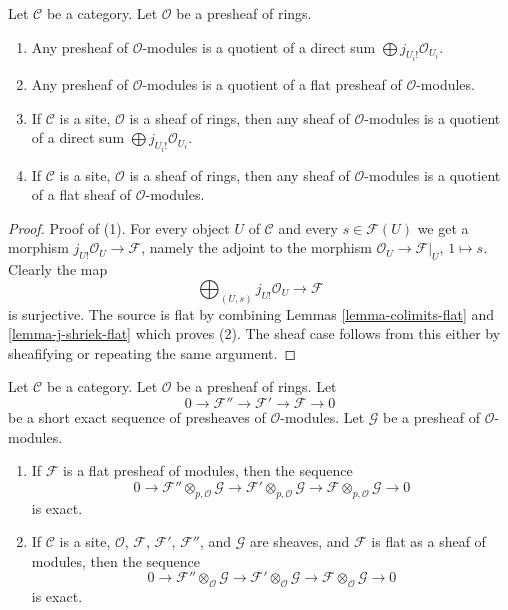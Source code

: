 \begin{lemma}
\label{lemma-module-quotient-flat}
Let $\mathcal{C}$ be a category.
Let $\mathcal{O}$ be a presheaf of rings.
\begin{enumerate}
\item Any presheaf of $\mathcal{O}$-modules is a quotient of
a direct sum $\bigoplus j_{U_i!}\mathcal{O}_{U_i}$.
\item Any presheaf of $\mathcal{O}$-modules is a quotient of
a flat presheaf of $\mathcal{O}$-modules.
\item If $\mathcal{C}$ is a site, $\mathcal{O}$ is a sheaf of rings,
then any sheaf of $\mathcal{O}$-modules is a quotient of
a direct sum $\bigoplus j_{U_i!}\mathcal{O}_{U_i}$.
\item If $\mathcal{C}$ is a site, $\mathcal{O}$ is a sheaf of rings,
then any sheaf of $\mathcal{O}$-modules is a quotient of
a flat sheaf of $\mathcal{O}$-modules.
\end{enumerate}
\end{lemma}

\begin{proof}
Proof of (1). For every object $U$ of $\mathcal{C}$ and every
$s \in \mathcal{F}(U)$ we get a morphism
$j_{U!}\mathcal{O}_U \to \mathcal{F}$, namely the adjoint to
the morphism $\mathcal{O}_U \to \mathcal{F}|_U$, $1 \mapsto s$.
Clearly the map
$$
\bigoplus\nolimits_{(U, s)} j_{U!}\mathcal{O}_U
\longrightarrow
\mathcal{F}
$$
is surjective. The source is flat by combining Lemmas
\ref{lemma-colimits-flat} and \ref{lemma-j-shriek-flat}
which proves (2). The sheaf case follows from this either by
sheafifying or repeating the same argument.
\end{proof}

\begin{lemma}
\label{lemma-flat-tor-zero}
Let $\mathcal{C}$ be a category.
Let $\mathcal{O}$ be a presheaf of rings.
Let
$$
0 \to \mathcal{F}'' \to \mathcal{F}' \to \mathcal{F} \to 0
$$
be a short exact sequence of presheaves of $\mathcal{O}$-modules.
Let $\mathcal{G}$ be a presheaf of $\mathcal{O}$-modules.
\begin{enumerate}
\item If $\mathcal{F}$ is a flat presheaf of modules, then
the sequence
$$
0 \to
\mathcal{F}'' \otimes_{p, \mathcal{O}} \mathcal{G} \to
\mathcal{F}' \otimes_{p, \mathcal{O}} \mathcal{G} \to
\mathcal{F} \otimes_{p, \mathcal{O}} \mathcal{G} \to 0
$$
is exact.
\item If $\mathcal{C}$ is a site, $\mathcal{O}$,
$\mathcal{F}$, $\mathcal{F}'$, $\mathcal{F}''$, and
$\mathcal{G}$ are sheaves, and $\mathcal{F}$ is flat
as a sheaf of modules, then the sequence
$$
0 \to
\mathcal{F}'' \otimes_\mathcal{O} \mathcal{G} \to
\mathcal{F}' \otimes_\mathcal{O} \mathcal{G} \to
\mathcal{F} \otimes_\mathcal{O} \mathcal{G} \to 0
$$
is exact.
\end{enumerate}
\end{lemma}

